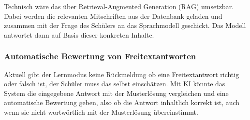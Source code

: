 Technisch wäre das über Retrieval-Augmented Generation (RAG) 
umsetzbar. Dabei werden die relevanten Mitschriften aus der 
Datenbank geladen und zusammen mit der Frage des Schülers an 
das Sprachmodell geschickt. Das Modell antwortet dann auf Basis 
dieser konkreten Inhalte.

\subsubsection{Automatische Bewertung von Freitextantworten}

Aktuell gibt der Lernmodus keine Rückmeldung ob eine Freitextantwort 
richtig oder falsch ist, der Schüler muss das selbst einschätzen. 
Mit KI könnte das System die eingegebene Antwort mit der 
Musterlösung vergleichen und eine automatische Bewertung geben, 
also ob die Antwort inhaltlich korrekt ist, auch wenn sie nicht 
wortwörtlich mit der Musterlösung übereinstimmt.